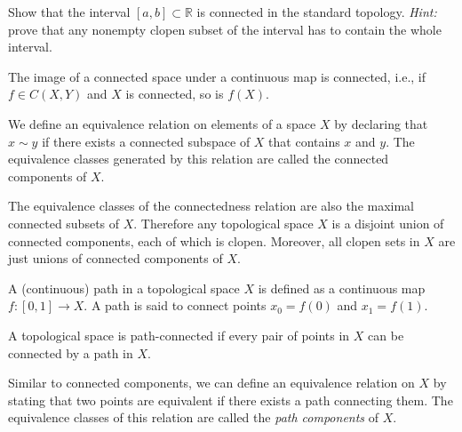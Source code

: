 \documentclass[english,letterpaper]{article}%
\numberwithin{equation}{section}
\numberwithin{figure}{section}
\numberwithin{table}{section}
\theoremstyle{definition}
\theoremstyle{definition}
\theoremstyle{definition}
\theoremstyle{plain}
\theoremstyle{plain}
\theoremstyle{plain}
\theoremstyle{plain}
\theoremstyle{remark}
\theoremstyle{remark}
\def\red{\color{red}}
\newcommand{\PRLsep}{   %
           \noindent\makebox[\linewidth]{
                \resizebox{0.5\linewidth}{1pt}{$\blacklozenge$}}}
\begin{document}
\begin{xca}
Show that the interval $[a,b]\subset\mathbb{R}$ is connected in the standard topology. \emph{Hint:} prove that any nonempty clopen subset of the interval has to contain the whole interval.
\end{xca}

\begin{prop}
The image of a connected space under a continuous map is connected, i.e., if $f\in C(X,Y)$ and $X$ is connected, so is $f(X)$.
\end{prop}

\begin{defn}
We define an equivalence relation on elements of a space $X$ by declaring that $x\sim y$ if there exists a connected subspace of $X$ that contains $x$ and $y$. The equivalence classes generated by this relation are called the connected components of $X$.
\end{defn}

The equivalence classes of the connectedness relation are also the maximal connected subsets of $X$. Therefore any topological space $X$ is a disjoint union of connected components, each of which is clopen. Moreover, all clopen sets in $X$ are just unions of connected components of $X$.

\begin{defn}[Path]
A (continuous) path in a topological space $X$ is defined as a continuous map $f:[0,1]\rightarrow X$. A path is said to connect points $x_0=f(0)$ and $x_1=f(1)$.
\end{defn}

\begin{defn}
A topological space is path-connected if every pair of points in $X$ can be connected by a path in $X$.
\end{defn}

Similar to connected components, we can define an equivalence relation on $X$ by stating that two points are equivalent if there exists a path connecting them. The equivalence classes of this relation are called the \emph{path components} of $X$.
\end{document}
